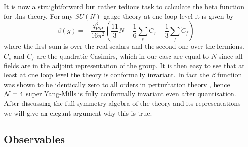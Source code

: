 It is now a straightforward but rather tedious task to calculate the beta function for this theory. 
For any $SU(N)$ gauge theory at one loop level it is given by \cite{Gross:1973}
\begin{equation}
	\beta(g) = - \frac{g_{YM}^3}{16\pi^2} \left( \frac{11}{3} N - \frac{1}{6} \sum_s C_s - \frac{1}{3} \sum_f \tilde{C}_f \right)
\end{equation}
where the first sum is over the real scalars and the second one over the fermions. 
$C_s$ and $\tilde{C}_f$ are the quadratic Casimirs, which in our case are equal to $N$ since all fields are in the adjoint representation of the group. 
It is then easy to see that at least at one loop level the theory is conformally invariant. 
In fact the $\beta$ function was shown to be identically zero to all orders in perturbation theory \cite{Mandelstam:1983, Brink:1983}, hence $\mathcal{N}=4$ super Yang-Mills is fully conformally invariant even after quantization. 
After discussing the full symmetry algebra of the theory and its representations we will give an elegant argument why this is true.

\subsection{Observables}

